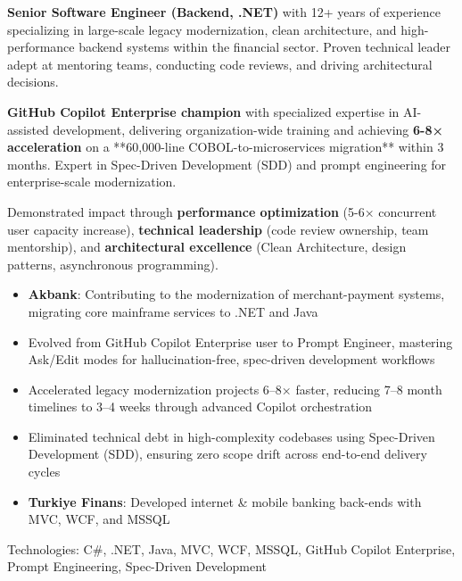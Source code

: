 \documentclass[10pt,a4paper,ragged2e,withhyper]{altacv}
\begin{document}


\makecvheader
{}

\begin{paracol}{2}



\textbf{Senior Software Engineer (Backend, .NET)} with 12+ years of experience specializing in large-scale legacy modernization, 
clean architecture, and high-performance backend systems within the financial sector. Proven technical leader 
adept at mentoring teams, conducting code reviews, and driving architectural decisions.

\textbf{GitHub Copilot Enterprise champion} with specialized expertise in AI-assisted development, delivering 
organization-wide training and achieving \textbf{6-8× acceleration} on a **60,000-line COBOL-to-microservices 
migration** within 3 months. Expert in Spec-Driven Development (SDD) and prompt engineering for 
enterprise-scale modernization.

Demonstrated impact through \textbf{performance optimization} (5-6× concurrent user capacity increase), 
\textbf{technical leadership} (code review ownership, team mentorship), and \textbf{architectural excellence} 
(Clean Architecture, design patterns, asynchronous programming).



\begin{itemize}
  \item \textbf{Akbank}: Contributing to the modernization of merchant-payment systems, migrating core mainframe services to .NET and Java
  \item Evolved from GitHub Copilot Enterprise user to Prompt Engineer, mastering Ask/Edit modes for hallucination-free, spec-driven development workflows
  \item Accelerated legacy modernization projects 6–8× faster, reducing 7–8 month timelines to 3–4 weeks through advanced Copilot orchestration
  \item Eliminated technical debt in high-complexity codebases using Spec-Driven Development (SDD), ensuring zero scope drift across end-to-end delivery cycles
  \item \textbf{Turkiye Finans}: Developed internet \& mobile banking back-ends with MVC, WCF, and MSSQL
\end{itemize}
Technologies: C\#, .NET, Java, MVC, WCF, MSSQL, GitHub Copilot Enterprise, Prompt Engineering, Spec-Driven Development




\end{paracol}
\end{document}
